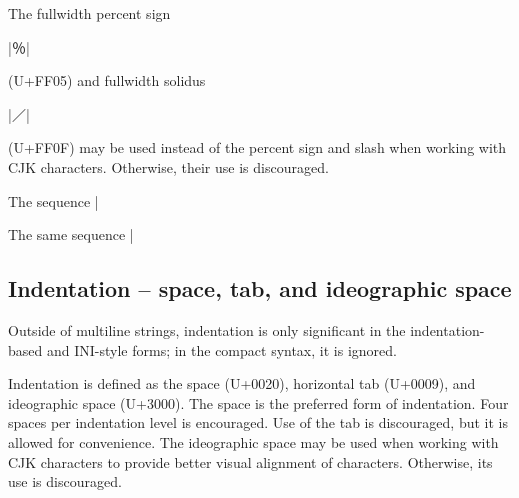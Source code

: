 \documentclass[11pt]{article}
\newcommand{\bespon}{BespON}
\begin{document}
The fullwidth percent sign \begin{CJK*}{UTF8}{gkai}|％|\end{CJK*} (U+FF05) and fullwidth solidus \begin{CJK*}{UTF8}{gkai}|／|\end{CJK*} (U+FF0F) may be used instead of the percent sign and slash when working with CJK characters.  Otherwise, their use is discouraged.

The sequence |%

The same sequence |%




\subsection{Indentation -- space, tab, and ideographic space}

Outside of multiline strings, indentation is only significant in the indentation-based and INI-style forms; in the compact syntax, it is ignored.

Indentation is defined as the space (U+0020), horizontal tab (U+0009), and ideographic space (U+3000).  The space is the preferred form of indentation.  Four spaces per indentation level is encouraged.  Use of the tab is discouraged, but it is allowed for convenience.  The ideographic space may be used when working with CJK characters to provide better visual alignment of characters.  Otherwise, its use is discouraged.
\end{document}
